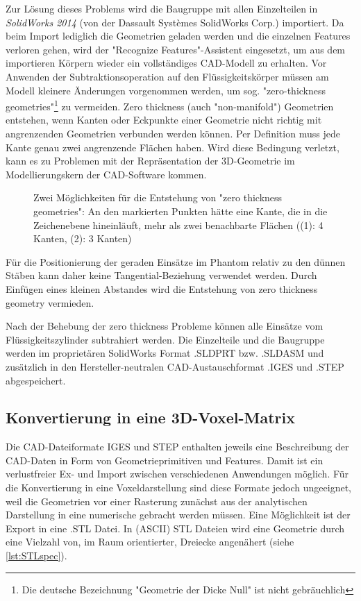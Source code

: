 Zur Lösung dieses Problems wird die Baugruppe mit allen Einzelteilen in \textit{SolidWorks 2014} (von der Dassault Systèmes SolidWorks Corp.) importiert. Da beim Import lediglich die Geometrien geladen werden und die einzelnen Features verloren gehen, wird der "Recognize Features"-Assistent eingesetzt, um aus dem importieren Körpern wieder ein vollständiges CAD-Modell zu erhalten. Vor Anwenden der Subtraktionsoperation auf den Flüssigkeitskörper müssen am Modell kleinere Änderungen vorgenommen werden, um sog. "zero-thickness geometries"\footnote{Die deutsche Bezeichnung "Geometrie der Dicke Null" ist nicht gebräuchlich} zu vermeiden. Zero thickness (auch  "non-manifold") Geometrien entstehen, wenn Kanten oder Eckpunkte einer Geometrie nicht richtig mit angrenzenden Geometrien verbunden werden können. Per Definition muss jede Kante genau zwei angrenzende Flächen haben. Wird diese Bedingung verletzt, kann es zu Problemen mit der Repräsentation der 3D-Geometrie im Modellierungskern der CAD-Software kommen.

\begin{figure}[H]
	\centering
	\caption[Zero Thickness]{Zwei Möglichkeiten für die Entstehung von "zero thickness geometries": An den markierten Punkten hätte eine Kante, die in die Zeichenebene hineinläuft, mehr als zwei benachbarte Flächen ((1): 4 Kanten, (2): 3 Kanten)}
	\label{fig:zeroThick}
\end{figure}

Für die Positionierung der geraden Einsätze im Phantom relativ zu den dünnen Stäben kann daher keine Tangential-Beziehung verwendet werden. Durch Einfügen eines kleinen Abstandes wird die Entstehung von zero thickness geometry vermieden.

Nach der Behebung der zero thickness Probleme können alle Einsätze vom Flüssigkeitszylinder subtrahiert werden. Die Einzelteile und die Baugruppe werden im proprietären SolidWorks Format .SLDPRT bzw. .SLDASM und zusätzlich in den Hersteller-neutralen CAD-Austauschformat .IGES und .STEP abgespeichert.

\subsection{Konvertierung in eine 3D-Voxel-Matrix}
Die CAD-Dateiformate IGES und STEP enthalten jeweils eine Beschreibung der CAD-Daten in Form von Geometrieprimitiven und Features. Damit ist ein verlustfreier Ex- und Import zwischen verschiedenen Anwendungen möglich. Für die Konvertierung in eine Voxeldarstellung sind diese Formate jedoch ungeeignet, weil die Geometrien vor einer Rasterung zunächst aus der analytischen Darstellung in eine numerische gebracht werden müssen. Eine Möglichkeit ist der Export in eine .STL Datei. In (ASCII) STL Dateien wird eine Geometrie durch eine Vielzahl von, im Raum orientierter, Dreiecke angenähert (siehe \autoref{lst:STLspec}).

